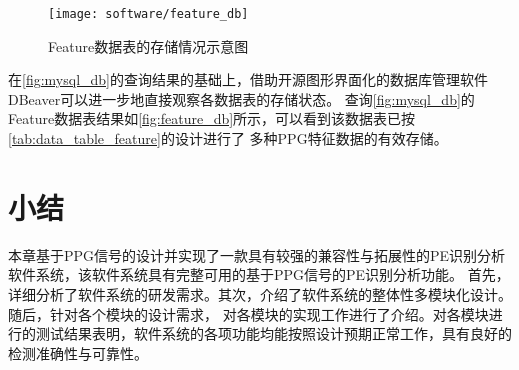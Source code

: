 \begin{figure}[htbp]
    \centering
    \texttt{[image: software/feature\_db]}
    \caption[Feature数据表的存储情况示意图]{\label{fig:feature_db}Feature数据表的存储情况示意图}
\end{figure}

在\autoref{fig:mysql_db}的查询结果的基础上，借助开源图形界面化的数据库管理软件DBeaver可以进一步地直接观察各数据表的存储状态\cite{dbeaver}。
查询\autoref{fig:mysql_db}的Feature数据表结果如\autoref{fig:feature_db}所示，可以看到该数据表已按\autoref{tab:data_table_feature}的设计进行了
多种PPG特征数据的有效存储。

\section{小结}
本章基于PPG信号的设计并实现了一款具有较强的兼容性与拓展性的PE识别分析软件系统，该软件系统具有完整可用的基于PPG信号的PE识别分析功能。
首先，详细分析了软件系统的研发需求。其次，介绍了软件系统的整体性多模块化设计。随后，针对各个模块的设计需求，
对各模块的实现工作进行了介绍。对各模块进行的测试结果表明，软件系统的各项功能均能按照设计预期正常工作，具有良好的检测准确性与可靠性。